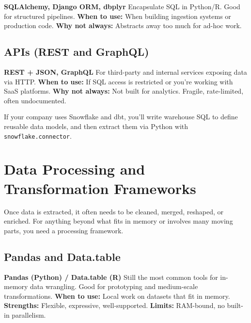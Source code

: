 \documentclass[12pt,openany, draft]{book}
\begin{document}
\textbf{SQLAlchemy, Django ORM, dbplyr} \newline
Encapsulate SQL in Python/R. Good for structured pipelines. \newline
\textbf{When to use:} When building ingestion systems or production code. \newline
\textbf{Why not always:} Abstracts away too much for ad-hoc work.

\subsection*{APIs (REST and GraphQL)}

\textbf{REST + JSON, GraphQL} \newline
For third-party and internal services exposing data via HTTP. \newline
\textbf{When to use:} If SQL access is restricted or you're working with SaaS platforms. \newline
\textbf{Why not always:} Not built for analytics. Fragile, rate-limited, often undocumented.

\begin{examplebox}
If your company uses Snowflake and dbt, you’ll write warehouse SQL to define reusable data models, and then extract them via Python with \texttt{snowflake.connector}.
\end{examplebox}




\section{Data Processing and Transformation Frameworks}

Once data is extracted, it often needs to be cleaned, merged, reshaped, or enriched. For anything beyond what fits in memory or involves many moving parts, you need a processing framework.

\subsection*{Pandas and Data.table}

\textbf{Pandas (Python) / Data.table (R)} \newline
Still the most common tools for in-memory data wrangling. Good for prototyping and medium-scale transformations. \newline
\textbf{When to use:} Local work on datasets that fit in memory. \newline
\textbf{Strengths:} Flexible, expressive, well-supported. \newline
\textbf{Limits:} RAM-bound, no built-in parallelism.
\end{document}
